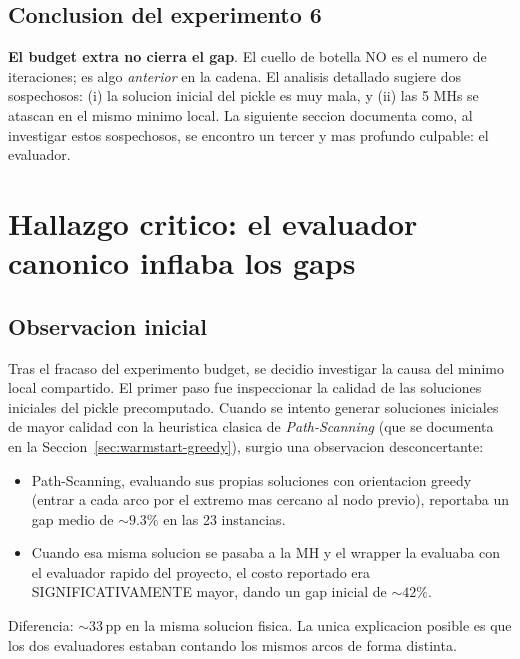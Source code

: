 \subsection{Conclusion del experimento 6}

\textbf{El budget extra no cierra el gap}. El cuello de botella NO es
el numero de iteraciones; es algo \emph{anterior} en la cadena. El
analisis detallado sugiere dos sospechosos: (i) la solucion inicial
del pickle es muy mala, y (ii) las 5 MHs se atascan en el mismo
minimo local. La siguiente seccion documenta como, al investigar
estos sospechosos, se encontro un tercer y mas profundo culpable: el
evaluador.

\section{Hallazgo critico: el evaluador canonico inflaba los gaps}
\label{sec:evaluador-canonico}

\subsection{Observacion inicial}

Tras el fracaso del experimento budget, se decidio investigar la causa
del minimo local compartido. El primer paso fue inspeccionar la
calidad de las soluciones iniciales del pickle precomputado. Cuando se
intento generar soluciones iniciales de mayor calidad con la heuristica
clasica de \emph{Path-Scanning} (que se documenta en la
Seccion~\ref{sec:warmstart-greedy}), surgio una observacion
desconcertante:

\begin{itemize}
\item Path-Scanning, evaluando sus propias soluciones con orientacion
  greedy (entrar a cada arco por el extremo mas cercano al nodo
  previo), reportaba un gap medio de $\sim 9.3\%$ en las 23
  instancias.
\item Cuando esa misma solucion se pasaba a la MH y el wrapper la
  evaluaba con el evaluador rapido del proyecto, el costo reportado
  era SIGNIFICATIVAMENTE mayor, dando un gap inicial de $\sim 42\%$.
\end{itemize}

Diferencia: $\sim 33$\,pp en la misma solucion fisica. La unica
explicacion posible es que los dos evaluadores estaban contando los
mismos arcos de forma distinta.

